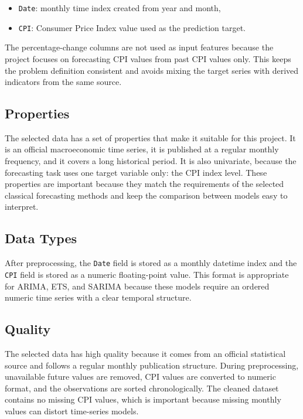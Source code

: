 \begin{itemize}
	\item \texttt{Date}: monthly time index created from year and month,
	\item \texttt{CPI}: Consumer Price Index value used as the prediction target.
\end{itemize}

The percentage-change columns are not used as input features because the project focuses on forecasting CPI values from past CPI values only. This keeps the problem definition consistent and avoids mixing the target series with derived indicators from the same source.

\subsection{Properties}

The selected data has a set of properties that make it suitable for this project. It is an official macroeconomic time series, it is published at a regular monthly frequency, and it covers a long historical period. It is also univariate, because the forecasting task uses one target variable only: the CPI index level. These properties are important because they match the requirements of the selected classical forecasting methods and keep the comparison between models easy to interpret.

\subsection{Data Types}

After preprocessing, the \texttt{Date} field is stored as a monthly datetime index and the \texttt{CPI} field is stored as a numeric floating-point value. This format is appropriate for ARIMA, ETS, and SARIMA because these models require an ordered numeric time series with a clear temporal structure.

\subsection{Quality}

The selected data has high quality because it comes from an official statistical source and follows a regular monthly publication structure. During preprocessing, unavailable future values are removed, CPI values are converted to numeric format, and the observations are sorted chronologically. The cleaned dataset contains no missing CPI values, which is important because missing monthly values can distort time-series models.

